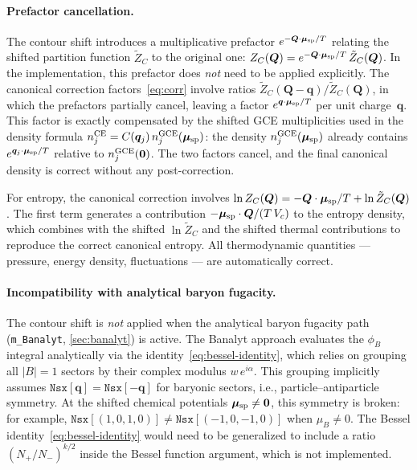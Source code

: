 \documentclass[11pt,a4paper]{article}
\newcommand{\bq}{\bm{q}}
\newcommand{\bQ}{\bm{Q}}
\begin{document}
\paragraph{Prefactor cancellation.}
The contour shift introduces a multiplicative prefactor $e^{-\bQ \cdot \bm{\mu}_{\rm sp}/T}$ relating the shifted partition function $\tilde{Z}_C$ to the original one: $Z_C(\bQ) = e^{-\bQ \cdot \bm{\mu}_{\rm sp}/T}\,\tilde{Z}_C(\bQ)$.
In the implementation, this prefactor does \emph{not} need to be applied explicitly.
The canonical correction factors~\cref{eq:corr} involve ratios $\tilde{Z}_C(\bQ - \bq)/\tilde{Z}_C(\bQ)$, in which the prefactors partially cancel, leaving a factor $e^{\bq \cdot \bm{\mu}_{\rm sp}/T}$ per unit charge~$\bq$.
This factor is exactly compensated by the shifted GCE multiplicities used in the density formula $n_j^{\rm CE} = C(\bq_j)\,n_j^{\rm GCE}(\bm{\mu}_{\rm sp})$: the density $n_j^{\rm GCE}(\bm{\mu}_{\rm sp})$ already contains $e^{\bq_j \cdot \bm{\mu}_{\rm sp}/T}$ relative to $n_j^{\rm GCE}(\bm{0})$.
The two factors cancel, and the final canonical density is correct without any post-correction.

For entropy, the canonical correction involves $\ln Z_C(\bQ) = -\bQ \cdot \bm{\mu}_{\rm sp}/T + \ln \tilde{Z}_C(\bQ)$.
The first term generates a contribution $-\bm{\mu}_{\rm sp} \cdot \bQ / (T\,V_c)$ to the entropy density, which combines with the shifted $\ln \tilde{Z}_C$ and the shifted thermal contributions to reproduce the correct canonical entropy.
All thermodynamic quantities --- pressure, energy density, fluctuations --- are automatically correct.

\paragraph{Incompatibility with analytical baryon fugacity.}
The contour shift is \emph{not} applied when the analytical baryon fugacity path (\texttt{m\_Banalyt}, \cref{sec:banalyt}) is active.
The Banalyt approach evaluates the $\phi_B$ integral analytically via the identity~\cref{eq:bessel-identity}, which relies on grouping all $|B|=1$ sectors by their complex modulus $w\,e^{i\alpha}$.
This grouping implicitly assumes $\texttt{Nsx}[\bq] = \texttt{Nsx}[-\bq]$ for baryonic sectors, i.e., particle--antiparticle symmetry.
At the shifted chemical potentials $\bm{\mu}_{\rm sp} \neq \bm{0}$, this symmetry is broken: for example, $\texttt{Nsx}[(1,0,1,0)] \neq \texttt{Nsx}[(-1,0,-1,0)]$ when $\mu_B \neq 0$.
The Bessel identity~\cref{eq:bessel-identity} would need to be generalized to include a ratio $(N_+/N_-)^{k/2}$ inside the Bessel function argument, which is not implemented.
\end{document}

